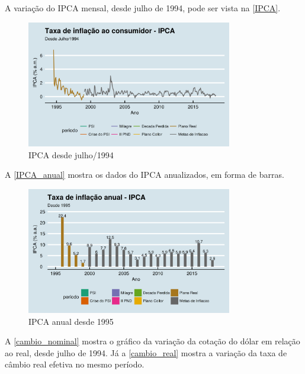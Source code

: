 \documentclass[
	10pt,				%
	openright,			%
	twoside,			%
	a5paper,			%
	english,			%
	french,				%
	spanish,			%
	brazil				%
	]{abntex2}
\begin{document}
A variação do IPCA mensal, desde julho de 1994, pode ser vista na
\autoref{IPCA}.

\begin{figure}[htbp]
\caption{IPCA desde julho/1994}\label{IPCA}
\begin{center}
\includegraphics[width=0.80000\textwidth]{imagens/IPCA-1.png}
\end{center}
\end{figure}

A \autoref{IPCA_anual} mostra os dados do IPCA anualizados, em forma de
barras.

\begin{figure}[htbp]
\caption{IPCA anual desde 1995}\label{IPCA_anual}
\begin{center}
\includegraphics[width=0.80000\textwidth]{imagens/IPCA_anual-1.png}
\end{center}
\end{figure}

A \autoref{cambio_nominal} mostra o gráfico da variação da cotação do
dólar em relação ao real, desde julho de 1994. Já a
\autoref{cambio_real} mostra a variação da taxa de câmbio real efetiva
no mesmo período.
\end{document}
